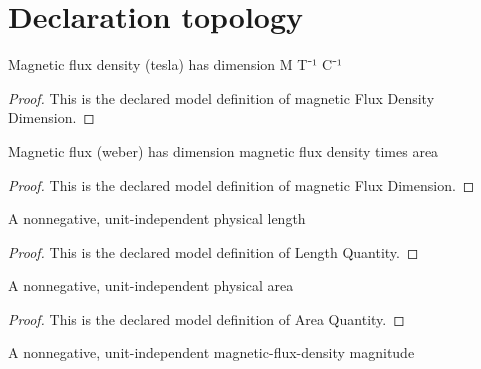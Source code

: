 \section{Declaration topology}
\begin{definition}
  \label{def:physics:phyx-mini-0929:phyxminiproblems-problemphyxmini0929-magneticfluxdensitydimension}
  Magnetic flux density (tesla) has dimension M T⁻¹ C⁻¹
\end{definition}
\begin{proof}
  This is the declared model definition of magnetic Flux Density Dimension.
\end{proof}
\begin{definition}
  \label{def:physics:phyx-mini-0929:phyxminiproblems-problemphyxmini0929-magneticfluxdimension}
  Magnetic flux (weber) has dimension magnetic flux density times area
\end{definition}
\begin{proof}
  This is the declared model definition of magnetic Flux Dimension.
\end{proof}
\begin{definition}
  \label{def:physics:phyx-mini-0929:phyxminiproblems-problemphyxmini0929-lengthquantity}
  A nonnegative, unit-independent physical length
\end{definition}
\begin{proof}
  This is the declared model definition of Length Quantity.
\end{proof}
\begin{definition}
  \label{def:physics:phyx-mini-0929:phyxminiproblems-problemphyxmini0929-areaquantity}
  A nonnegative, unit-independent physical area
\end{definition}
\begin{proof}
  This is the declared model definition of Area Quantity.
\end{proof}
\begin{definition}
  \label{def:physics:phyx-mini-0929:phyxminiproblems-problemphyxmini0929-magneticfluxdensitymagnitude}
  A nonnegative, unit-independent magnetic-flux-density magnitude
\end{definition}
